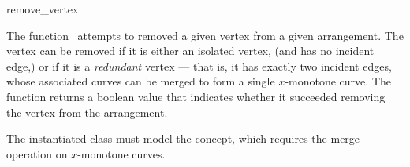 \ccRefPageBegin

\begin{ccRefFunction}{remove_vertex}

\ccDefinition

The function \ccRefName\ attempts to removed a given vertex from a given
arrangement. The vertex can be removed if it is either an isolated vertex,
(and has no incident edge,) or if it is a {\em redundant} vertex --- that
is, it has exactly two incident edges, whose associated curves can be
merged to form a single $x$-monotone curve.
The function returns a boolean value that indicates whether it succeeded
removing the vertex from the arrangement.



The instantiated  class must model the
 concept, which requires the merge
operation on $x$-monotone curves.
	       
\end{ccRefFunction}

\ccRefPageEnd
